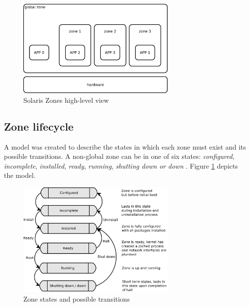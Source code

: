 \documentclass[11pt]{book}
\begin{document}
        \begin{figure}[H]
          \begin{center}
            \includegraphics[width=0.7\textwidth]{img/solaris/zones-high-level.pdf}
          \end{center}

          \caption{Solaris Zones high-level view}
        \end{figure}


      \subsection{Zone lifecycle}
      \label{sub:}

        A model was created to describe the states in which each zone must exist and its possible transitions. A non-global zone can be
        in one of six states: \textit{configured}, \textit{incomplete}, \textit{installed}, \textit{ready},
        \textit{running}, \textit{shutting down or down} \cite{sag}. Figure \ref{fig:sol:lifecycle} depicts the model.

        \begin{figure}[H]
          \begin{center}
            \includegraphics[width=0.7\textwidth]{img/solaris/zone_states.pdf}
          \end{center}

          \caption{Zone states and possible transitions}
          \label{fig:sol:lifecycle}
        \end{figure}
\end{document}
